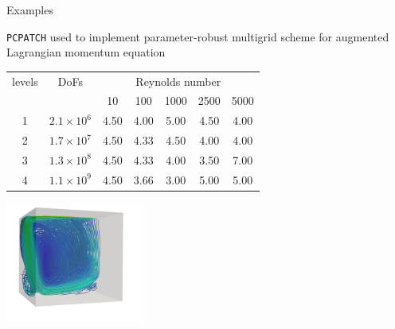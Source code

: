 \documentclass[paperwidth=60in,paperheight=36in,landscape]{baposter}
\begin{document}
\begin{poster}
\begin{posterbox}[name=examples, column=4, span=2, height=0.85]{Examples}
    {\raggedright \texttt{PCPATCH} used to implement parameter-robust multigrid scheme
    for augmented Lagrangian momentum equation\par}

    \begin{minipage}[c]{0.6\textwidth}
      \strut\vspace*{-\baselineskip}\newline
      \begin{tabular}{cc|ccccc}
        \toprule
        levels & DoFs & \multicolumn{5}{c}{Reynolds number} \\
               && 10 & 100 & 1000 & 2500 & 5000 \\
        \midrule
        1 & $2.1 \times 10^6$ & 4.50 & 4.00 & 5.00 & 4.50 & 4.00 \\
        2 & $1.7 \times 10^7$ & 4.50 & 4.33 & 4.50 & 4.00 & 4.00 \\
        3 & $1.3 \times 10^8$ & 4.50 & 4.33 & 4.00 & 3.50 & 7.00 \\
        4 & $1.1 \times 10^9$ & 4.50 & 3.66 & 3.00 & 5.00 & 5.00 \\
        \bottomrule
      \end{tabular}
    \end{minipage}
    \hfill
    \hspace{0.5em}
    \begin{minipage}[c]{0.4\textwidth}
      \strut\vspace*{-\baselineskip}\newline
      {\centering \includegraphics[height=4cm]{LDC-streamlines}\par}
    \end{minipage}


\end{posterbox}
\end{poster}
\end{document}
